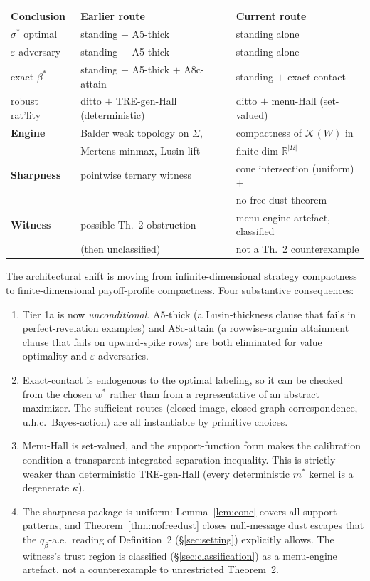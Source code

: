 \documentclass[11pt]{article}
\theoremstyle{definition}
\theoremstyle{remark}
\newcommand{\R}{\mathbb{R}}
\newcommand{\eps}{\varepsilon}
\newcommand{\Om}{\Omega}
\newcommand{\Si}{\Sigma}
\begin{document}
\begin{center}
\begin{tabular}{lll}
\hline
\textbf{Conclusion} & \textbf{Earlier route} & \textbf{Current route}\\
\hline
$\sigma^*$ optimal & standing $+$ A5-thick & standing alone\\
$\eps$-adversary    & standing $+$ A5-thick & standing alone\\
exact $\beta^*$    & standing $+$ A5-thick $+$ A8c-attain & standing $+$ exact-contact\\
robust rat'lity   & ditto $+$ TRE-gen-Hall (deterministic) & ditto $+$ menu-Hall (set-valued)\\
\hline
\textbf{Engine}    & Balder weak topology on $\Si$, & compactness of $\mathcal K(W)$ in\\
                   & Mertens minmax, Lusin lift     & finite-dim $\R^{|\Om|}$\\
\hline
\textbf{Sharpness} & pointwise ternary witness     & cone intersection (uniform) +\\
                   &                               & no-free-dust theorem\\
\hline
\textbf{Witness} & possible Th.~2 obstruction     & menu-engine artefact, classified\\
                 & (then unclassified)            & not a Th.~2 counterexample\\
\hline
\end{tabular}
\end{center}

The architectural shift is moving from infinite-dimensional strategy
compactness to finite-dimensional payoff-profile compactness. Four
substantive consequences:

\begin{enumerate}[leftmargin=2em]
\item Tier 1a is now \emph{unconditional}. A5-thick (a Lusin-thickness
clause that fails in perfect-revelation examples) and A8c-attain (a
rowwise-argmin attainment clause that fails on upward-spike rows) are
both eliminated for value optimality and $\eps$-adversaries.
\item Exact-contact is endogenous to the optimal labeling, so it can
be checked from the chosen $w^*$ rather than from a representative
of an abstract maximizer. The sufficient routes (closed image,
closed-graph correspondence, u.h.c.\ Bayes-action) are all
instantiable by primitive choices.
\item Menu-Hall is set-valued, and the support-function form makes
the calibration condition a transparent integrated separation
inequality. This is strictly weaker than deterministic TRE-gen-Hall
(every deterministic $m^*$ kernel is a degenerate $\kappa$).
\item The sharpness package is uniform: Lemma~\ref{lem:cone} covers
all support patterns, and Theorem~\ref{thm:nofreedust} closes
null-message dust escapes that the $q_\beta$-a.e.\ reading of
Definition~2 (\S\ref{sec:setting}) explicitly allows. The witness's
trust region is classified (\S\ref{sec:classification}) as a
menu-engine artefact, not a counterexample to unrestricted
Theorem~2.
\end{enumerate}
\end{document}
